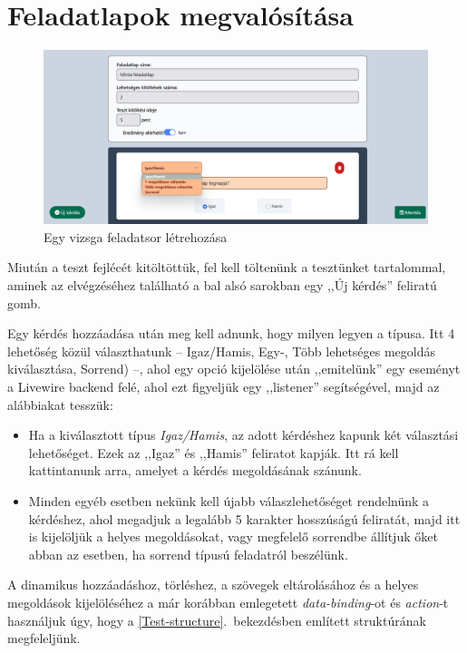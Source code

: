 \documentclass[
]{thesis-ekf}
\theoremstyle{definition}
\theoremstyle{remark}
\begin{document}
            \section{Feladatlapok megvalósítása}
            \begin{figure}[ht!]
    		\centering
    		\includegraphics[width=15cm]{Test.create.png}
                \caption{Egy vizsga feladatsor létrehozása}
    		\label{fig-tesztek-create}
    	\end{figure}
            Miután a teszt fejlécét kitöltöttük, fel kell töltenünk a tesztünket tartalommal, aminek az elvégzéséhez található a bal alsó sarokban egy ,,Új kérdés'' feliratú gomb.
            
            Egy kérdés hozzáadása után meg kell adnunk, hogy milyen legyen a típusa. Itt 4 lehetőség közül választhatunk -- Igaz/Hamis, Egy-, Több lehetséges megoldás kiválasztása, Sorrend) --, ahol egy opció kijelölése után ,,emitelünk'' egy eseményt a Livewire backend felé, ahol ezt figyeljük egy ,,listener'' segítségével, majd az alábbiakat tesszük: 
            \begin{itemize}
                \item Ha a kiválasztott típus \emph{Igaz/Hamis}, az adott kérdéshez kapunk két választási lehetőséget. Ezek az ,,Igaz'' és ,,Hamis'' feliratot kapják. Itt rá kell kattintanunk arra, amelyet a kérdés megoldásának szánunk.
                \item Minden egyéb esetben nekünk kell újabb válaszlehetőséget rendelnünk a kérdéshez, ahol megadjuk a legalább 5 karakter hosszúságú feliratát, majd itt is kijelöljük a helyes megoldásokat, vagy megfelelő sorrendbe állítjuk őket abban az esetben, ha sorrend típusú feladatról beszélünk. 
            \end{itemize}

            A dinamikus hozzáadáshoz, törléshez, a szövegek eltárolásához és a helyes megoldások kijelöléséhez a már korábban emlegetett \emph{data-binding}-ot és \emph{action}-t használjuk úgy, hogy a \ref{Test-structure}.~bekezdésben említett struktúrának megfeleljünk.
\end{document}

